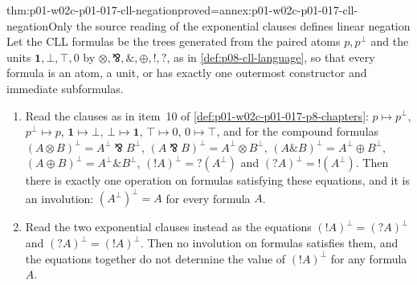 \begin{hblemma}{thm:p01-w02c-p01-017-cll-negation}{proved=annex:p01-w02c-p01-017-cll-negation}{Only the source reading of the exponential clauses defines linear negation}
Let the CLL formulas be the trees generated from the paired atoms
\(p,p^\perp\) and the units \(\mathbf 1,\bot,\top,0\) by
\(\otimes,\bindnasrepma,\mathbin{\&},\oplus,!,?\), as in
\cref{def:p08-cll-language}, so that every formula is an atom, a unit,
or has exactly one outermost constructor and immediate subformulas.
\begin{enumerate}
\item Read the clauses as in item~10 of
  \cref{def:p01-w02c-p01-017-p8-chapters}: \(p\mapsto p^\perp\),
  \(p^\perp\mapsto p\), \(\mathbf 1\mapsto\bot\), \(\bot\mapsto\mathbf 1\),
  \(\top\mapsto0\), \(0\mapsto\top\), and for the compound formulas
  \((A\otimes B)^\perp=A^\perp\bindnasrepma B^\perp\),
  \((A\bindnasrepma B)^\perp=A^\perp\otimes B^\perp\),
  \((A\mathbin{\&}B)^\perp=A^\perp\oplus B^\perp\),
  \((A\oplus B)^\perp=A^\perp\mathbin{\&}B^\perp\),
  \((!A)^\perp=?(A^\perp)\) and \((?A)^\perp=!(A^\perp)\).  Then there is
  exactly one operation on formulas satisfying these equations, and it
  is an involution: \((A^\perp)^\perp=A\) for every formula \(A\).
\item Read the two exponential clauses instead as the equations
  \((!A)^\perp=(?A)^\perp\) and \((?A)^\perp=(!A)^\perp\).  Then no
  involution on formulas satisfies them, and the equations together do
  not determine the value of \((!A)^\perp\) for any formula \(A\).
\end{enumerate}
\end{hblemma}

